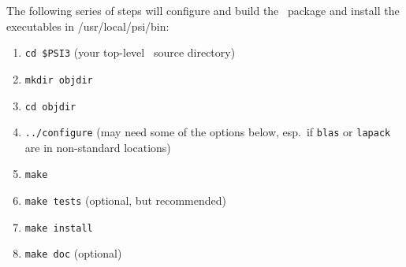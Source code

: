 \documentclass[12pt]{article}
\begin{document}
The following series of steps will configure and build the \PSIthree\
package and install the executables in /usr/local/psi/bin:

\begin{enumerate}
\item {\tt cd \$PSI3} (your top-level \PSIthree\ source directory)
\item {\tt mkdir objdir}
\item {\tt cd objdir}
\item {\tt ../configure} (may need some of the options below, esp.~if
  {\tt blas} or {\tt lapack} are in non-standard locations)
\item {\tt make}
\item {\tt make tests} (optional, but recommended)
\item {\tt make install}
\item {\tt make doc} (optional)
\end{enumerate}
\end{document}

